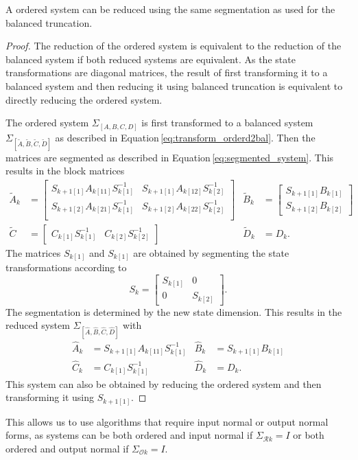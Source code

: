 \documentclass[doctype=mastersthesis,BCOR=15mm,biblatex]{ldvbook}%
\newcommand{\R}{\mathcal{R}} %
\newcommand{\Ob}{\mathcal{O}} %
\newcommand{\eye}{I} %
\begin{document}
A ordered system can be reduced using the same segmentation as used for the balanced truncation.
\begin{proof}
	The reduction of the ordered system is equivalent to the reduction of the balanced system if both reduced systems are equivalent.  
	As the state transformations are diagonal matrices, the result of first transforming it to a balanced system and then reducing it using balanced truncation is equivalent to directly reducing the ordered system. %
	
	The ordered system $\Sigma_{[A,B,C,D]}$ is first transformed to a balanced system $\Sigma_{[\tilde{A},\tilde{B},\tilde{C},\tilde{D}]}$ as described in Equation\,\ref{eq:transform_orderd2bal}.
	Then the matrices are segmented as described in Equation\,\ref{eq:segmented_system}.
	This results in the block matrices
	\begin{subequations}
	\begin{align}
	\tilde{A}_k &=\begin{bmatrix}
	S_{k+1[1]}A_{k[11]}S_{k[1]}^{-1} & S_{k+1[1]}A_{k[12]}S_{k[2]}^{-1} \\
	S_{k+1[2]}A_{k[21]}S_{k[1]}^{-1} & S_{k+1[2]}A_{k[22]}S_{k[2]}^{-1} \\
	\end{bmatrix}
	&
	\tilde{B}_k &= \begin{bmatrix}
	S_{k+1[1]}B_{k[1]} \\ S_{k+1[2]}B_{k[2]}
	\end{bmatrix} 
	\\
	\tilde{C} &= \begin{bmatrix}
	C_{k[1]}S_{k[1]}^{-1} & C_{k[2]}S_{k[2]}^{-1}
	\end{bmatrix}& 
	\tilde{D}_k&=D_k
	.
	\end{align}
	\end{subequations}
	The matrices $	S_{k[1]}$ and $S_{k[1]}$ are obtained by segmenting the state transformations according to
	\begin{equation}
		S_k = 
		\begin{bmatrix}
		S_{k[1]} & 0\\
		0 & S_{k[2]}
		\end{bmatrix}
		.
	\end{equation}
	The segmentation is determined by the new state dimension.
	This results in the reduced system $\Sigma_{[\hat{A},\hat{B},\hat{C},\hat{D}]}$ with
	\begin{align}
	\hat{A}_k &= S_{k+1[1]}A_{k[11]}S_{k[1]}^{-1}  & \hat{B}_k &= S_{k+1[1]}B_{k[1]}\\
	\hat{C}_k &=C_{k[1]}S_{k[1]}^{-1}     & \hat{D}_k &= D_k
	.
	\end{align}
	This system can also be obtained by reducing the ordered system and then transforming it using $S_{k+1[1]}$.
\end{proof}
This allows us to use algorithms that require input normal or output normal forms, as systems can be both ordered and input normal if $\Sigma_{\R k}=\eye$ or both ordered and output normal if $\Sigma_{\Ob k}=\eye$.
\end{document}
